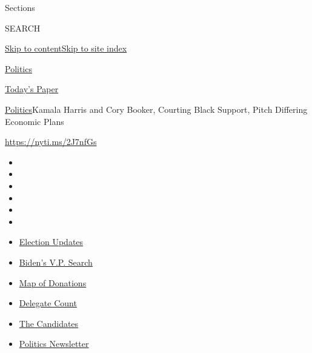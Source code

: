 Sections

SEARCH

\protect\hyperlink{site-content}{Skip to
content}\protect\hyperlink{site-index}{Skip to site index}

\href{https://www.nytimes.com/section/politics}{Politics}

\href{https://myaccount.nytimes.com/auth/login?response_type=cookie\&client_id=vi}{}

\href{https://www.nytimes.com/section/todayspaper}{Today's Paper}

\href{/section/politics}{Politics}\textbar{}Kamala Harris and Cory
Booker, Courting Black Support, Pitch Differing Economic Plans

\url{https://nyti.ms/2J7nfGs}

\begin{itemize}
\item
\item
\item
\item
\item
\item
\end{itemize}

\begin{itemize}
\item
  \href{https://www.nytimes.com/2020/07/31/us/elections/biden-vs-trump.html?action=click\&pgtype=Article\&state=default\&region=TOP_BANNER\&context=storylines_menu}{Election
  Updates}
\item
  \href{https://www.nytimes.com/article/biden-vice-president-2020.html?action=click\&pgtype=Article\&state=default\&region=TOP_BANNER\&context=storylines_menu}{Biden's
  V.P. Search}
\item
  \href{https://www.nytimes.com/interactive/2020/07/24/us/politics/trump-biden-campaign-donors.html?action=click\&pgtype=Article\&state=default\&region=TOP_BANNER\&context=storylines_menu}{Map
  of Donations}
\item
  \href{https://www.nytimes.com/interactive/2020/us/elections/delegate-count-primary-results.html?action=click\&pgtype=Article\&state=default\&region=TOP_BANNER\&context=storylines_menu}{Delegate
  Count}
\item
  \href{https://www.nytimes.com/interactive/2019/us/politics/2020-presidential-candidates.html?action=click\&pgtype=Article\&state=default\&region=TOP_BANNER\&context=storylines_menu}{The
  Candidates}
\item
  \href{https://www.nytimes.com/newsletters/politics?action=click\&pgtype=Article\&state=default\&region=TOP_BANNER\&context=storylines_menu}{Politics
  Newsletter}
\end{itemize}

